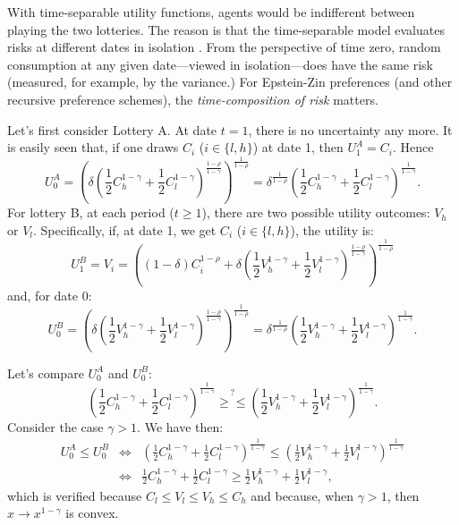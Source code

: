 \documentclass[
  12pt,
]{book}
\theoremstyle{definition}
\theoremstyle{definition}
\theoremstyle{definition}
\theoremstyle{definition}
\theoremstyle{remark}
\begin{document}
With time-separable utility functions, agents would be indifferent between playing the two lotteries. The reason is that the time-separable model evaluates risks at different dates in isolation \citep{Piazzesi_Schneider_2007}. From the perspective of time zero, random consumption at any given date---viewed in isolation---does have the same risk (measured, for example, by the variance.) For Epstein-Zin preferences (and other recursive preference schemes), the \emph{time-composition of risk} matters.

Let's first consider Lottery A. At date \(t=1\), there is no uncertainty any more. It is easily seen that, if one draws \(C_i\) (\(i \in \{l,h\}\)) at date 1, then \(U_1^A = C_i\). Hence
\begin{equation}
U_0^A =  \left(\delta \left(\frac{1}{2}C_h^{1-\gamma}+\frac{1}{2}C_l^{1-\gamma}\right)^{\frac{1-\rho}{1-\gamma}}\right)^{\frac{1}{1-\rho}}= \delta^{\frac{1}{1-\rho}} \left(\frac{1}{2}C_h^{1-\gamma}+\frac{1}{2}C_l^{1-\gamma}\right)^{\frac{1}{1-\gamma}}.\label{eq:U0A}
\end{equation}
For lottery B, at each period (\(t\ge1\)), there are two possible utility outcomes: \(V_h\) or \(V_l\). Specifically, if, at date 1, we get \(C_i\) (\(i \in \{l,h\}\)), the utility is:
\begin{equation}
U_1^B = V_i = \left((1-\delta)C_i^{1-\rho} + \delta \left(\frac{1}{2}V_h^{1-\gamma}+\frac{1}{2}V_l^{1-\gamma}\right)^{\frac{1-\rho}{1-\gamma}}\right)^{\frac{1}{1-\rho}}\label{eq:ABCD}
\end{equation}
and, for date 0:
\[
U_0^B =  \left(\delta \left(\frac{1}{2}V_h^{1-\gamma}+\frac{1}{2}V_l^{1-\gamma}\right)^{\frac{1-\rho}{1-\gamma}}\right)^{\frac{1}{1-\rho}}= \delta^{\frac{1}{1-\rho}}\left(\frac{1}{2}V_h^{1-\gamma}+\frac{1}{2}V_l^{1-\gamma}\right)^{\frac{1}{1-\gamma}}.
\]

Let's compare \(U_0^A\) and \(U_0^B\):
\[
\left(\frac{1}{2}C_h^{1-\gamma}+\frac{1}{2}C_l^{1-\gamma}\right)^{\frac{1}{1-\gamma}}
\overset{?}{\ge \le}
\left(\frac{1}{2}V_h^{1-\gamma}+\frac{1}{2}V_l^{1-\gamma}\right)^{\frac{1}{1-\gamma}}.
\]
Consider the case \(\gamma > 1\). We have then:
\begin{eqnarray*}
U_0^A \le U_0^B &\Leftrightarrow& \left(\frac{1}{2}C_h^{1-\gamma}+\frac{1}{2}C_l^{1-\gamma}\right)^{\frac{1}{1-\gamma}} \le \left(\frac{1}{2}V_h^{1-\gamma}+\frac{1}{2}V_l^{1-\gamma}\right)^{\frac{1}{1-\gamma}}\\
&\Leftrightarrow& \frac{1}{2}C_h^{1-\gamma}+\frac{1}{2}C_l^{1-\gamma} \ge \frac{1}{2}V_h^{1-\gamma}+\frac{1}{2}V_l^{1-\gamma},
\end{eqnarray*}
which is verified because \(C_l \le V_l \le V_h \le C_h\) and because, when \(\gamma > 1\), then \(x\rightarrow x^{1-\gamma}\) is convex.
\end{document}
